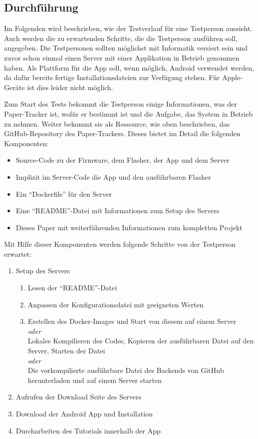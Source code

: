 \subsection{Durchführung}
Im Folgenden wird beschrieben, wie der Testverlauf für eine Testperson aussieht.
Auch werden die zu erwartenden Schritte, die die Testperson ausführen soll, angegeben.
Die Testpersonen sollten möglichst mit Informatik versiert sein und zuvor schon einmal einen Server mit einer
Applikation in Betrieb genommen haben.
Als Plattform für die App soll, wenn möglich, Android verwendet werden, da dafür bereits fertige Installationsdateien
zur Verfügung stehen.
Für Apple-Geräte ist dies leider nicht möglich.

Zum Start des Tests bekommt die Testperson einige Informationen, was der Paper-Tracker ist, wofür er bestimmt ist
und die Aufgabe, das System in Betrieb zu nehmen.
Weiter bekommt sie als Ressource, wie oben beschrieben, das GitHub-Repository des Paper-Trackers.
Dieses bietet im Detail die folgenden Komponenten:
\begin{itemize}
	\item Source-Code zu der Firmware, dem Flasher, der App und dem Server
	\item Implizit im Server-Code die App und den ausführbaren Flasher
	\item Ein \enquote{Dockerfile} für den Server
	\item Eine \enquote{README}-Datei mit Informationen zum Setup des Servers
	\item Dieses Paper mit weiterführenden Informationen zum kompletten Projekt
\end{itemize}

Mit Hilfe dieser Komponenten werden folgende Schritte von der Testperson erwartet:
\begin{enumerate}
	\item Setup des Servers
	\begin{enumerate}
		\item Lesen der \enquote{README}-Datei
		\item Anpassen der Konfigurationsdatei mit geeigneten Werten
		\item Erstellen des Docker-Images und Start von diesem auf einem Server \hfill \\
			\hspace*{10mm} \emph{oder} \hfill \\
			Lokales Kompilieren des Codes, Kopieren der ausführbaren Datei auf den Server, Starten der Datei
			\\
			\hspace*{10mm} \emph{oder} \\
			Die vorkompilierte ausführbare Datei des Backends von GitHub herunterladen und auf einem
			Server starten
	\end{enumerate}
	\item Aufrufen der Download Seite des Servers
	\item Download der Android App und Installation
	\item Durcharbeiten des Tutorials innerhalb der App
\end{enumerate}

